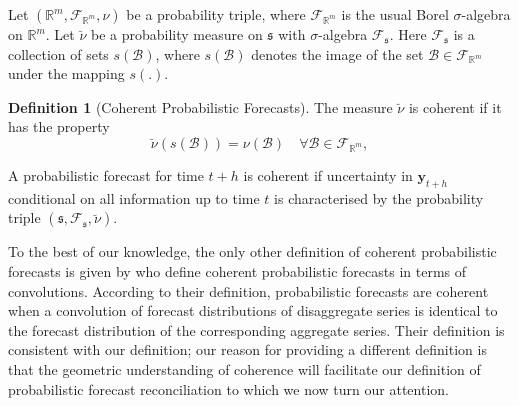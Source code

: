 \documentclass[12pt]{article}
\theoremstyle{definition}
\newtheorem{definition}{Definition}[section]
\begin{document}
Let $(\mathbb{R}^m, \mathscr{F}_{\mathbb{R}^m}, \nu)$ be a probability triple, where $\mathscr{F}_{\mathbb{R}^m}$ is the usual Borel $\sigma$-algebra on $\mathbb{R}^m$. Let $\breve{\nu}$ be a probability measure on $\mathfrak{s}$ with $\sigma$-algebra $\mathscr{F}_{\mathfrak{s}}$. Here $\mathscr{F}_{\mathfrak{s}}$ is a collection of sets $s(\mathcal{B})$, where $s(\mathcal{B})$ denotes the image of the set $\mathcal{B}\in \mathscr{F}_{\mathbb{R}^m}$ under the mapping $s(.)$.

\begin{definition}[Coherent Probabilistic Forecasts]\label{def:cohprob}
	The measure $\breve{\nu}$ is coherent if it has the property
	\[
	\breve{\nu}(s(\mathcal{B})) = \nu(\mathcal{B}) \quad \forall \mathcal{B} \in \mathscr{F}_{\mathbb{R}^m},
	\]
\end{definition}

A probabilistic forecast for time $t+h$ is coherent if uncertainty in $\bm{y}_{t+h}$ conditional on all information up to time $t$ is characterised by the probability triple $(\mathfrak{s},\mathscr{F}_{\mathfrak{s}},\breve{\nu})$.

To the best of our knowledge, the only other definition of coherent probabilistic forecasts is given by \citet{BenTaieb2017} who define coherent probabilistic forecasts in terms of convolutions. According to their definition, probabilistic forecasts are coherent when a convolution of forecast distributions of disaggregate series is identical to the forecast distribution of the corresponding aggregate series. Their definition is consistent with our definition; our reason for providing a different definition is that the geometric understanding of coherence will facilitate our definition of probabilistic forecast reconciliation to which we now turn our attention.

%
%	
%
\end{document}
